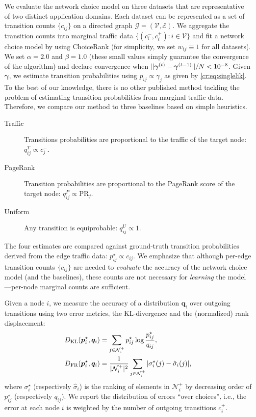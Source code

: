 We evaluate the network choice model on three datasets that are representative of two distinct application domains.
Each dataset can be represented as a set of transition counts $\{ c_{ij} \}$ on a directed graph $\mathcal{G} = (\mathcal{V}, \mathcal{E})$.
We aggregate the transition counts into marginal traffic data $\{ (c^-_i, c^+_i) : i \in \mathcal{V} \}$ and fit a network choice model by using ChoiceRank (for simplicity, we set $w_{ij} \equiv 1$ for all datasets).
We set $\alpha = 2.0$ and $\beta = 1.0$ (these small values simply guarantee the convergence of the algorithm) and declare convergence when $\lVert\bm{\gamma}^{(t)} - \bm{\gamma}^{(t-1)}\rVert / N < 10^{-8}$.
Given $\bm{\gamma}$, we estimate transition probabilities using $p_{ij} \propto \gamma_j$ as given by \eqref{cr:eq:singlelik}.
To the best of our knowledge, there is no other published method tackling the problem of estimating transition probabilities from marginal traffic data.
Therefore, we compare our method to three baselines based on simple heuristics.
\begin{description}
\item[Traffic] Transitions probabilities are proportional to the traffic of the target node: $q_{ij}^T \propto c_j^{-}$.
\item[PageRank] Transition probabilities are proportional to the PageRank score of the target node: $q_{ij}^P \propto \text{PR}_j$.
\item[Uniform] Any transition is equiprobable: $q_{ij}^U \propto 1$.
\end{description}
The four estimates are compared against ground-truth transition probabilities derived from the edge traffic data: $p_{ij}^\star \propto c_{ij}$.
We emphasize that although per-edge transition counts $\{c_{ij}\}$ are needed to \emph{evaluate} the accuracy of the network choice model (and the baselines), these counts are not necessary for \emph{learning} the model---per-node marginal counts are sufficient.

Given a node $i$, we measure the accuracy of a distribution $\bm{q}_i$ over outgoing transitions using two error metrics, the KL-divergence and the (normalized) rank displacement:
\begin{align*}
D_{\text{KL}}(\bm{p}_i^\star, \bm{q}_i) &= \sum_{j \in \mathcal{N}^+_i} p^\star_{ij} \log \frac{p^\star_{ij}}{q_{ij}}, \\
D_{\text{FR}}(\bm{p}_i^\star, \bm{q}_i) &= \frac{1}{\lvert\mathcal{N}^+_i\rvert^2} \sum_{j \in \mathcal{N}^+_i} \vert \sigma^\star_i(j) - \hat{\sigma}_i(j) \vert,
\end{align*}
where $\sigma^\star_i$ (respectively $\hat{\sigma}_i$) is the ranking of elements in $\mathcal{N}^+_i$ by decreasing order of $p^\star_{ij}$ (respectively $q_{ij}$).
We report the distribution of errors ``over choices'', i.e., the error at each node $i$ is weighted by the number of outgoing transitions $c^+_i$.


